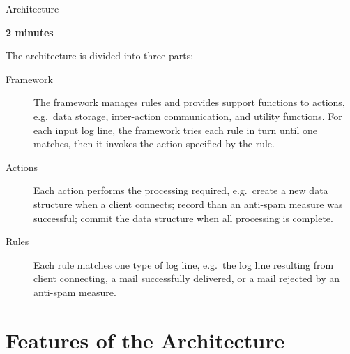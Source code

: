 \documentclass{beamer}
\newcommand{\timingnote}[1]{%
    \textbf{#1}%
}
\begin{document}
\begin{frame}{Architecture}

    \timingnote{2 minutes}

    The architecture is divided into three parts:

    \begin{description}

        \item [Framework] The framework manages rules and provides support
            functions to actions, e.g.\ data storage, inter-action
            communication, and utility functions.  For each input log line,
            the framework tries each rule in turn until one matches, then
            it invokes the action specified by the rule.

        \item [Actions] Each action performs the processing required, e.g.\
            create a new data structure when a client connects; record than
            an anti-spam measure was successful; commit the data structure
            when all processing is complete.

        \item [Rules] Each rule matches one type of log line, e.g.\ the log
            line resulting from client connecting, a mail successfully
            delivered, or a mail rejected by an anti-spam measure.

    \end{description}

\end{frame}

\section{Features of the Architecture}
\end{document}
